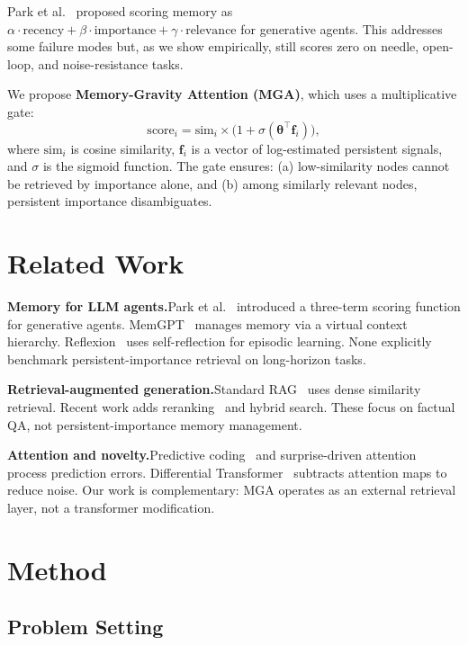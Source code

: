 \documentclass{article}
\begin{document}
Park et al.~\citep{park2023generative} proposed scoring memory as $\alpha \cdot \text{recency} + \beta \cdot \text{importance} + \gamma \cdot \text{relevance}$ for generative agents. This addresses some failure modes but, as we show empirically, still scores zero on needle, open-loop, and noise-resistance tasks.

We propose \textbf{Memory-Gravity Attention (MGA)}, which uses a multiplicative gate:
\begin{equation}
\text{score}_i = \text{sim}_i \times \bigl(1 + \sigma(\boldsymbol{\theta}^\top \mathbf{f}_i)\bigr),
\end{equation}
where $\text{sim}_i$ is cosine similarity, $\mathbf{f}_i$ is a vector of log-estimated persistent signals, and $\sigma$ is the sigmoid function. The gate ensures: (a) low-similarity nodes cannot be retrieved by importance alone, and (b) among similarly relevant nodes, persistent importance disambiguates.

\section{Related Work}

\textbf{Memory for LLM agents.}\quad Park et al.~\citep{park2023generative} introduced a three-term scoring function for generative agents. MemGPT~\citep{packer2023memgpt} manages memory via a virtual context hierarchy. Reflexion~\citep{shinn2023reflexion} uses self-reflection for episodic learning. None explicitly benchmark persistent-importance retrieval on long-horizon tasks.

\textbf{Retrieval-augmented generation.}\quad Standard RAG~\citep{lewis2020retrieval} uses dense similarity retrieval. Recent work adds reranking~\citep{glass2022re2g} and hybrid search. These focus on factual QA, not persistent-importance memory management.

\textbf{Attention and novelty.}\quad Predictive coding~\citep{friston2010free} and surprise-driven attention~\citep{itti2009bayesian} process prediction errors. Differential Transformer~\citep{ye2024diff} subtracts attention maps to reduce noise. Our work is complementary: MGA operates as an external retrieval layer, not a transformer modification.

\section{Method}

\subsection{Problem Setting}
\end{document}
